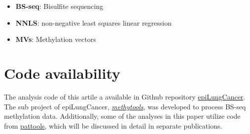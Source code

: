 \documentclass[12pt,letterpaper]{article}
\begin{document}
\begin{itemize}
    \item  \textbf{BS-seq}: Bisulfite sequencing
    \item  \textbf{NNLS}: non-negative least squares linear regression
    \item  \textbf{MVs}: Methylation vectors
\end{itemize}

\section{Code availability}\label{sec:code}

The analysis code of this artile a available in Github repository
\href{https://github.com/hcyvan/epiLungCancer}{epiLungCancer}. The sub project of epiLungCancer,
\href{https://github.com/hcyvan/epiLungCancer/tree/main/methytools}{\textit{methytools}},  was developed
to process BS-seq methylation data. Additionally, some of the analyses in this paper utilize code
from \href{https://github.com/hcyvan/pattools}{pattools}, which will be discussed in detail in
separate publications.




\end{document}
